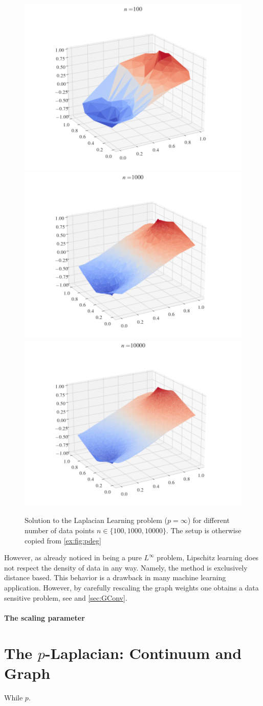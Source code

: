 \begin{figure}
\includegraphics[width=.28\textwidth, trim={3.1cm 1cm 3.5cm 0cm},clip]{code/SSL/2Dex_100-p=inf.png}%
\hfill%
\includegraphics[width=.28\textwidth,trim={3.1cm 1cm 3.5cm 0cm},clip]{code/SSL/2Dex_1000-p=inf.png}%
\hfill%
\includegraphics[width=.28\textwidth,trim={3.1cm 1cm 3.5cm 0cm},clip]{code/SSL/2Dex_10000-p=inf.png}%
%
\caption{Solution to the Laplacian Learning problem ($p=\infty$) for different number of data points $n\in\{100,1000,10000\}$. The setup is otherwise copied from \cref{ex:fig:pdeg}}\label{fig:pinf}
\end{figure}
%
However, as already noticed in \cite{el2016asymptotic} being a pure $L^\infty$ problem, Lipschitz learning does not respect the density of data in any way. Namely, the method is exclusively distance based. This behavior is a drawback in many machine learning application. However, by carefully rescaling the graph weights one obtains a data sensitive problem, see \cite{calder2019consistency} and \cref{sec:GConv}.

\begin{figure}

\end{figure}
%
%
%
\paragraph{The scaling parameter}


%
%
%
%
%
%
%
\section{The $p$-Laplacian: Continuum and Graph}\label{sec:pLap}
%
%
While $p$.
%
%
%
